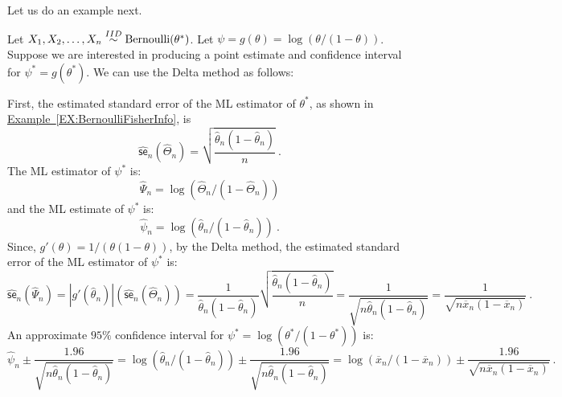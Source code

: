 Let us do an example next.
\begin{example}\label{EX:BernoulliDelta}
Let $X_1,X_2,\ldots,X_n \overset{IID}{\sim} \mbox{{\rm Bernoulli}}(\theta^*)$.  Let $\psi=g(\theta)=\log(\theta/(1-\theta))$.  Suppose we are interested in producing a point estimate and confidence interval for $\psi^*=g(\theta^*)$.  We can use the Delta method as follows: 

First, the estimated standard error of the ML estimator of $\theta^*$, as shown in \hyperref[EX:BernoulliFisherInfo]{Example~\ref*{EX:BernoulliFisherInfo}}, is
\[
\widehat{\mathsf{se}}_n(\widehat{\Theta}_n) = \sqrt{\frac{\widehat{\theta}_n (1-\widehat{\theta}_n)}{n}} \ .
\]
The ML estimator of $\psi^*$ is:
$$\widehat{\Psi}_n=\log(\widehat{\Theta}_n / (1-\widehat{\Theta}_n))$$ 
and the ML estimate of $\psi^*$ is:
$$\widehat{\psi}_n=\log(\widehat{\theta}_n / (1-\widehat{\theta}_n)) \ .$$
Since, $g'(\theta) = 1/(\theta (1-\theta))$, by the Delta method, the estimated standard error of the ML estimator of $\psi^*$ is:
\[
\widehat{\mathsf{se}}_n(\widehat{\Psi}_n) = |g'(\widehat{\theta}_n)| (\widehat{\mathsf{se}}_n(\widehat{\Theta}_n))
= \frac{1}{\widehat{\theta}_n (1-\widehat{\theta}_n)} \sqrt{\frac{\widehat{\theta}_n (1-\widehat{\theta}_n)}{n}}
= \frac{1}{\sqrt{n\widehat{\theta}_n (1-\widehat{\theta}_n)}}
= \frac{1}{\sqrt{n \overline{x}_n (1-\overline{x}_n)}} \ .
\]
An approximate $95\%$ confidence interval for $\psi^*=\log(\theta^*/(1-\theta^*))$ is:
\[
\widehat{\psi}_n \pm \frac{1.96}{\sqrt{n \widehat{\theta}_n (1-\widehat{\theta}_n)}}
= \log(\widehat{\theta}_n / (1-\widehat{\theta}_n)) \pm \frac{1.96}{\sqrt{n \widehat{\theta}_n (1-\widehat{\theta}_n)}}
= \log(\overline{x}_n / (1-\overline{x}_n)) \pm \frac{1.96}{\sqrt{n \overline{x}_n (1-\overline{x}_n)}} \ .
\]
\end{example}

